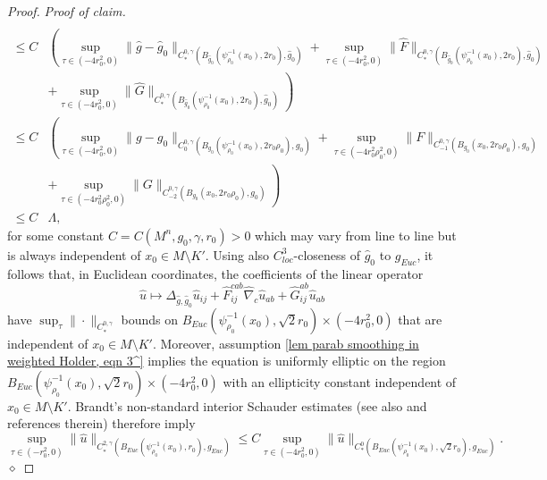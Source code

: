 \documentclass[12pt]{amsart}
\renewcommand{\1}{{\mathbf 1}}
\newenvironment{claimproof}{\par\noindent\textit{Proof of claim.}\space}{\hfill$\diamond$\medskip\par}
\theoremstyle{others}
\numberwithin{equation}{section}
\begin{document}
\begin{proof}
\begin{claimproof}
\begin{align*}
            \\
            \le C & \left(  \sup_{\tau \in (-4r_0^2, 0)} \| \hat g - \hat g_0 \|_{C^{0, \gamma}_*( B_{\hat g_0}( \psi_{\rho_0}^{-1}(x_0),  2 r_0) ,  \hat g_0) } + \sup_{\tau \in (-4r_0^2, 0)} \| \hat F \|_{C^{0, \gamma}_*( B_{\hat g_0}( \psi_{\rho_0}^{-1}(x_0),  2 r_0) , \hat g_0) } \right.\\
            & \left. + \sup_{\tau \in (-4r_0^2, 0)} \| \hat G \|_{C^{0, \gamma}_*( B_{\hat g_0}( \psi_{\rho_0}^{-1}(x_0),  2 r_0)  , \hat g_0) } \right)
            \\
            \le  C &\left(  \sup_{\tau \in (-4r_0^2, 0)} \|  g -  g_0 \|_{C^{0, \gamma}_0( B_{g_0}( \psi_{\rho_0}^{-1}(x_0), 2 r_0 \rho_0) ,  g_0) } + \sup_{\tau \in (-4r_0^2\rho_0^2 , 0)} \|  F \|_{C^{0, \gamma}_{-1}( B_{g_0}( x_0, 2 r_0 \rho_0) ,  g_0) } \right. \\
            &\left.+ \sup_{\tau \in (-4r_0^2\rho_0^2, 0)} \|  G \|_{C^{0, \gamma}_{-2}( B_{g_0}( x_0, 2 r_0 \rho_0)  ,  g_0) } \right) \\
            \le C & \Lambda,
        \end{align*}
        for some constant $C = C(M^n, g_0, \gamma, r_0) >0 $ which may vary from line to line but is always independent of $x_0 \in M \setminus K'$.
        Using also $C^3_{loc}$-closeness of $\hat g_0$ to $g_{Euc}$, it follows that, in Euclidean coordinates, the coefficients of the linear operator
            $$\hat u \mapsto  \Delta_{\hat g, \hat g_0} \hat u_{ij}+ \hat F^{cab}_{ij} \hat \nabla_c \hat u_{ab} + \hat G^{ab}_{ij} \hat u_{ab}$$
        have $\sup_\tau \| \cdot \|_{C^{0, \gamma}_*}$ bounds on $B_{Euc}(\psi_{\rho_0}^{-1} (x_0) , \sqrt 2 r_0) \times (-4r_0^2, 0)$ that are independent of $x_0 \in M \setminus K'$.
        Moreover, assumption \eqref{lem parab smoothing in weighted Holder, eqn 3^} implies the equation is uniformly elliptic on the region $B_{Euc}(\psi_{\rho_0}^{-1} (x_0) , \sqrt 2 r_0) \times (-4r_0^2, 0)$ with an ellipticity constant independent of $x_0 \in M \setminus K'$.
        Brandt's non-standard interior Schauder estimates \cite{Brandt69} (see also  \cite[Theorem 3.6]{ChodoshSchulze21} and references therein)
        therefore imply
        \begin{equation}  \label{proof parab smoothing in weighted Holder, eqn 4}
            \sup_{\tau \in (-r_0^2, 0)} \| \hat u \|_{C^{2, \gamma}_{ *} ( B_{Euc} ( \psi_{\rho_0}^{-1}(x_0) , r_0) , g_{Euc}) } 
            \le C \sup_{\tau \in (-4r_0^2, 0)}  \| \hat u \|_{C^0_{ *} (B_{Euc} ( \psi_{\rho_0}^{-1}(x_0) , \sqrt 2 r_0) , g_{Euc})} .

\end{equation}
\end{claimproof}
\end{proof}
\end{document}

